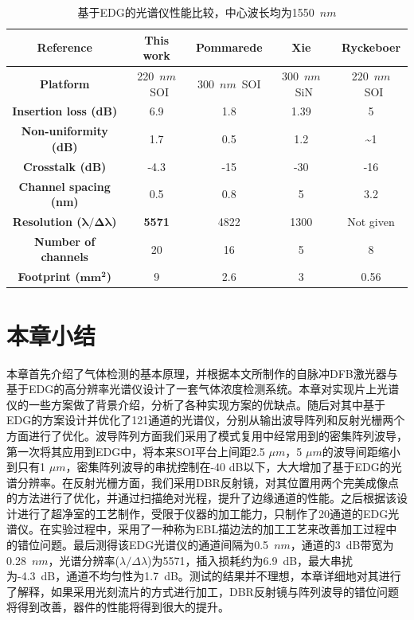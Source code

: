 \begin{table}[htb]
	\captionsetup{justification=centering}
	\caption{基于EDG的光谱仪性能比较，中心波长均为1550~$nm$}
	\label{spectrometer_comparison}
	\centering
	\begin{tabular}[t]{|c|c|c|c|c|}
		\hline
		\textbf{Reference} & This work & Pommarede\cite{pommarede201716} & Xie\cite{xie2018silicon} & Ryckeboer\cite{ryckeboer2013silicon} \\
		\hline
		\textbf{Platform} & 220~$nm$~SOI & 300~$nm$~SOI & 300~$nm$~SiN & 220~$nm$~SOI\\
		\hline
		\textbf{Insertion loss (dB)} & 6.9 & 1.8 & 1.39 & 5\\
		\hline
		\textbf{Non-uniformity (dB)} & 1.7 & 0.5 & 1.2 & \~{}1\\
		\hline
		\textbf{Crosstalk (dB)} & -4.3 & -15 & -30 & -16\\
		\hline
		\textbf{Channel spacing (nm)} & 0.5 & 0.8 & 5 & 3.2\\
		\hline
		\textbf{Resolution ($\pmb{\lambda/\Delta\lambda}$)} & \textbf{{\color{red}5571}} & 4822 & 1300 & Not given \\
		\hline
		\textbf{Number of channels} & 20 & 16 & 5 & 8 \\
		\hline
		\textbf{Footprint ($\pmb{mm^{2}}$)} & 9 & 2.6 & 3 & 0.56\\
		\hline
	\end{tabular}
\end{table}

\section{本章小结}
本章首先介绍了气体检测的基本原理，并根据本文所制作的自脉冲DFB激光器与基于EDG的高分辨率光谱仪设计了一套气体浓度检测系统。本章对实现片上光谱仪的一些方案做了背景介绍，分析了各种实现方案的优缺点。随后对其中基于EDG的方案设计并优化了121通道的光谱仪，分别从输出波导阵列和反射光栅两个方面进行了优化。波导阵列方面我们采用了模式复用中经常用到的密集阵列波导，第一次将其应用到EDG中，将本来SOI平台上间距2.5 $\mu m$，5 $\mu m$的波导间距缩小到只有1 $\mu m$，密集阵列波导的串扰控制在-40 dB以下，大大增加了基于EDG的光谱分辨率。在反射光栅方面，我们采用DBR反射镜，对其位置用两个完美成像点的方法进行了优化，并通过扫描绝对光程，提升了边缘通道的性能。之后根据该设计进行了超净室的工艺制作，受限于仪器的加工能力，只制作了20通道的EDG光谱仪。在实验过程中，采用了一种称为EBL描边法的加工工艺来改善加工过程中的错位问题。最后测得该EDG光谱仪的通道间隔为0.5~$nm$，通道的3~dB带宽为0.28~$nm$，光谱分辨率($\lambda/\Delta\lambda$)为5571，插入损耗约为6.9~dB，最大串扰为-4.3~dB，通道不均匀性为1.7~dB。测试的结果并不理想，本章详细地对其进行了解释，如果采用光刻流片的方式进行加工，DBR反射镜与阵列波导的错位问题将得到改善，器件的性能将得到很大的提升。
